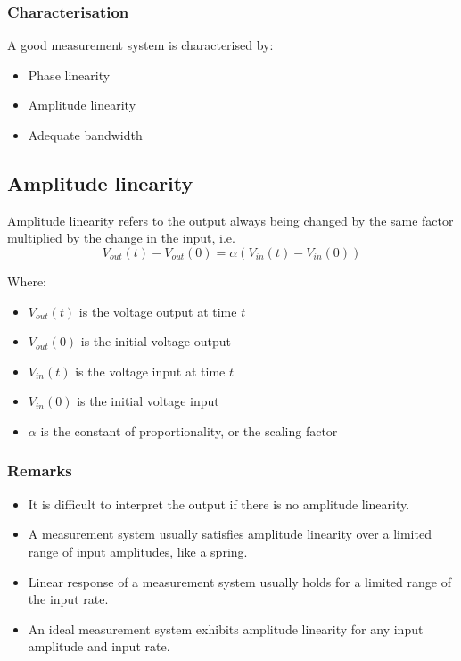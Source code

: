 \documentclass[11pt]{article}
\begin{document}
\subsubsection{Characterisation}
\label{sec:org960484a}
A good measurement system is characterised by:
\begin{itemize}
\item Phase linearity
\item Amplitude linearity
\item Adequate bandwidth
\end{itemize}
\subsection{Amplitude linearity}
\label{sec:orgddb4541}
Amplitude linearity refers to the output always being changed by the same factor multiplied by the change in the input, i.e.
\[V_{out} (t) - V_{out} (0) = \alpha (V_{in} (t) - V_{in} (0))\]

Where:
\begin{itemize}
\item \(V_{out} (t)\) is the voltage output at time \(t\)
\item \(V_{out} (0)\) is the initial voltage output
\item \(V_{in} (t)\) is the voltage input at time \(t\)
\item \(V_{in} (0)\) is the initial voltage input
\item \(\alpha\) is the constant of proportionality, or the scaling factor
\end{itemize}
\subsubsection{Remarks}
\label{sec:org5a392c5}
\begin{itemize}
\item It is difficult to interpret the output if there is no amplitude linearity.
\item A measurement system usually satisfies amplitude linearity over a limited range of input amplitudes, like a spring.
\item Linear response of a measurement system usually holds for a limited range of the input rate.
\item An ideal measurement system exhibits amplitude linearity for any input amplitude and input rate.
\end{itemize}

 \newpage
\end{document}
